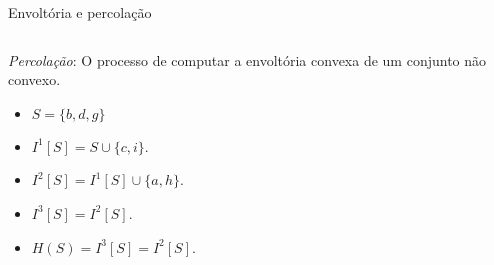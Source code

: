 \begin{frame}{Envoltória e percolação}
\begin{columns}[T]
\begin{column}{0.5\textwidth}
                  
                  \emph{Percolação}: O processo de computar a envoltória convexa de um conjunto não convexo.

                  \begin{itemize}
                        \item<2-> $S=\{b,d,g\}$
                        \item<3-> $I^1[S]=S \cup \{c,i\}$.
                        \item<4-> $I^2[S]=I^1[S] \cup \{a,h\}$.
                        \item<5-> $I^3[S]=I^2[S]$.
                        \item<5-> $H(S)=I^3[S]=I^2[S]$.

                  \end{itemize}
            \end{column}
      \end{columns}
\end{frame}


